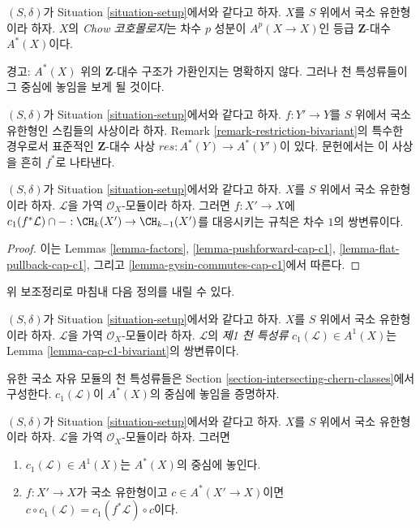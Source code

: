 \begin{definition}
\label{definition-chow-cohomology}
$(S, \delta)$가 Situation \ref{situation-setup}에서와 같다고 하자.
$X$를 $S$ 위에서 국소 유한형이라 하자. $X$의 {\it Chow 코호몰로지}는
차수 $p$ 성분이 $A^p(X \to X)$인 등급 $\mathbf{Z}$-대수 $A^*(X)$이다.
\end{definition}

\noindent
경고: $A^*(X)$ 위의 $\mathbf{Z}$-대수 구조가 가환인지는 명확하지 않다.
그러나 천 특성류들이 그 중심에 놓임을 보게 될 것이다.

\begin{remark}
\label{remark-pullback-cohomology}
$(S, \delta)$가 Situation \ref{situation-setup}에서와 같다고 하자.
$f : Y' \to Y$를 $S$ 위에서 국소 유한형인 스킴들의 사상이라 하자.
Remark \ref{remark-restriction-bivariant}의 특수한 경우로서 표준적인
$\mathbf{Z}$-대수 사상 $res : A^*(Y) \to A^*(Y')$이 있다. 문헌에서는
이 사상을 흔히 $f^*$로 나타낸다.
\end{remark}

\begin{lemma}
\label{lemma-cap-c1-bivariant}
$(S, \delta)$가 Situation \ref{situation-setup}에서와 같다고 하자.
$X$를 $S$ 위에서 국소 유한형이라 하자.
$\mathcal{L}$을 가역 $\mathcal{O}_X$-모듈이라 하자. 그러면
$f : X' \to X$에
$c_1(f^*\mathcal{L}) \cap - : \CH_k(X') \to \CH_{k - 1}(X')$를
대응시키는 규칙은 차수 $1$의 쌍변류이다.
\end{lemma}

\begin{proof}
이는 Lemmas \ref{lemma-factors},
\ref{lemma-pushforward-cap-c1},
\ref{lemma-flat-pullback-cap-c1}, 그리고
\ref{lemma-gysin-commutes-cap-c1}에서 따른다.
\end{proof}

\noindent
위 보조정리로 마침내 다음 정의를 내릴 수 있다.

\begin{definition}
\label{definition-first-chern-class}
$(S, \delta)$가 Situation \ref{situation-setup}에서와 같다고 하자.
$X$를 $S$ 위에서 국소 유한형이라 하자. $\mathcal{L}$을 가역
$\mathcal{O}_X$-모듈이라 하자. $\mathcal{L}$의 {\it 제1 천 특성류}
$c_1(\mathcal{L}) \in A^1(X)$는 Lemma \ref{lemma-cap-c1-bivariant}의
쌍변류이다.
\end{definition}

\noindent
유한 국소 자유 모듈의 천 특성류들은 Section
\ref{section-intersecting-chern-classes}에서 구성한다.
$c_1(\mathcal{L})$이 $A^*(X)$의 중심에 놓임을 증명하자.

\begin{lemma}
\label{lemma-c1-center}
$(S, \delta)$가 Situation \ref{situation-setup}에서와 같다고 하자.
$X$를 $S$ 위에서 국소 유한형이라 하자.
$\mathcal{L}$을 가역 $\mathcal{O}_X$-모듈이라 하자. 그러면
\begin{enumerate}
\item $c_1(\mathcal{L}) \in A^1(X)$는 $A^*(X)$의 중심에 놓인다.
\item $f : X' \to X$가 국소 유한형이고 $c \in A^*(X' \to X)$이면
$c \circ c_1(\mathcal{L}) = c_1(f^*\mathcal{L}) \circ c$이다.
\end{enumerate}
\end{lemma}

